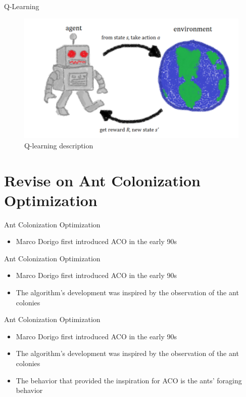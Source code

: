 \documentclass[aspectratio=169,xcolor=dvipsnames]{beamer}
\begin{document}
\begin{frame}{Q-Learning}
    \begin{figure}
        \centering
        \includegraphics[scale = 0.5]{Q-learning description.png}
        \caption{Q-learning description}
        \label{fig:my_label}
    \end{figure}
\end{frame}

\section{Revise on Ant Colonization Optimization}
\begin{frame}{Ant Colonization Optimization}
    \begin{itemize}
        \item Marco Dorigo first introduced ACO in the early 90s
    \end{itemize}
\end{frame}

\begin{frame}{Ant Colonization Optimization}
    \begin{itemize}
        \item Marco Dorigo first introduced ACO in the early 90s
        \item The algorithm's development was inspired by the observation of the ant colonies
    \end{itemize}
\end{frame}

\begin{frame}{Ant Colonization Optimization}
    \begin{itemize}
        \item Marco Dorigo first introduced ACO in the early 90s
        \item The algorithm's development was inspired by the observation of the ant colonies
        \item The behavior that provided the inspiration for ACO is the ants' foraging behavior
    \end{itemize}
\end{frame}
\end{document}
